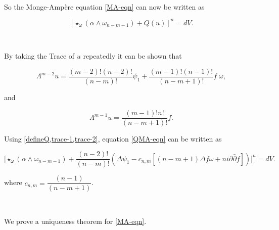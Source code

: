 \documentclass[10pt,a4paper]{amsart}
\newcommand{\pbp}{\partial \bar{\partial}}
\numberwithin{equation}{section}
\begin{document}
\

So the Monge-Amp\`ere equation \eqref{MA-eqn} can now be written as 

\begin{equation}\label{QMA-eqn}
    \left[\star_{\omega}(\alpha\wedge \omega_{n-m-1}) + Q(u)\right]^n = dV.
\end{equation}

\



By taking the Trace of $u$ repeatedly it can be shown that 

\begin{equation}\label{trace-2}
    \Lambda^{m-2} u =\frac{(m-2)!(n-2)!}{(n-m)!} \psi_1 + \frac{(m-1)!(n-1)!}{(n-m+1)!} f \; \omega,
\end{equation}

\noindent and 

\begin{equation}\label{trace-1}
\Lambda^{m-1} u = \frac{(m-1)! n!}{(n-m+1)!}f.
\end{equation}

Using \cref{defineQ,trace-1,trace-2}, equation \eqref{QMA-eqn} can be written as

\begin{equation}\label{QMA-primitives}
    \Big[\star_{\omega}(\alpha\wedge \omega_{n-m-1}) + \frac{(n-2)!}{(n-m)!}\left(\Delta \psi_1 - c_{n,m}\left[(n-m+1)\Delta f \omega +  n i \pbp f \right]\right)\Big]^n = dV.
\end{equation}

\noindent where $c_{n,m} =\dfrac{(n-1)}{(n-m+1)}$. 


\

We prove a uniqueness theorem for \eqref{MA-eqn}.
\end{document}
